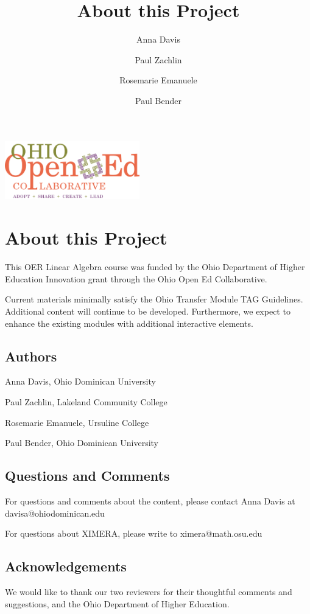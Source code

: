 \documentclass{ximera}
\author{Anna Davis \and Paul Zachlin \and Rosemarie Emanuele \and Paul Bender}\title{About this Project}\license{CC-BY 4.0}
\begin{document}
\maketitle

\begin{image}
\includegraphics[height=1in]{ooec.jpg}
\end{image}

\section{About this Project}
This OER Linear Algebra course was funded by the Ohio Department of Higher Education Innovation grant through the Ohio Open Ed Collaborative. 

Current materials minimally satisfy the Ohio Transfer Module TAG Guidelines.  Additional content will continue to be developed.  Furthermore, we expect to enhance the existing modules with additional interactive elements.

\subsection{Authors}
Anna Davis, Ohio Dominican University

Paul Zachlin, Lakeland Community College

Rosemarie Emanuele, Ursuline College

Paul Bender, Ohio Dominican University

\subsection{Questions and Comments}
For questions and comments about the content, please contact Anna Davis at davisa@ohiodominican.edu

For questions about XIMERA, please write to ximera@math.osu.edu

\subsection{Acknowledgements}
We would like to thank our two reviewers for their thoughtful comments and suggestions, and the Ohio Department of Higher Education.
\end{document}
